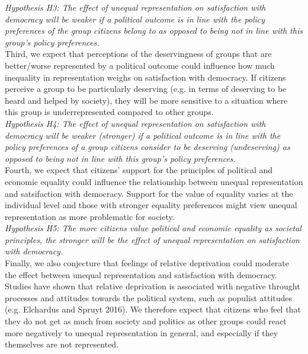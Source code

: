 \documentclass[12pt, letterpaper]{article}
\begin{document}
\begin{spacing}{1.5}
\smallskip  \textit{Hypothesis H3: The effect of unequal representation on satisfaction with democracy will be weaker if a political outcome is in line with the policy preferences of the group citizens belong to as opposed to being not in line with this group's policy preferences.}\\

Third, we expect that perceptions of the deservingness of groups that are better/worse represented by a political outcome could influence how much inequality in representation weighs on satisfaction with democracy. If citizens perceive a group to be particularly deserving (e.g. in terms of deserving to be heard and helped by society), they will be more sensitive to a situation where this group is underrepresented compared to other groups.\\

\smallskip  \textit{Hypothesis H4: The effect of unequal representation on satisfaction with democracy will be weaker (stronger) if a political outcome is in line with the policy preferences of a group citizens consider to be deserving (undeserving) as opposed to being not in line with this group's policy preferences.}\\

Fourth, we expect that citizens' support for the principles of political and economic equality could influence the relationship between unequal representation and satsifaction with democracy. Support for the value of equality varies at the individual level and those with stronger equality preferences might view unequal representation as more problematic for society.\\

\smallskip  \textit{Hypothesis H5: The more citizens value political and economic equality as societal principles, the stronger will be the effect of unequal representation on satisfaction with democracy.}\\

Finally, we also conjecture that feelings of relative deprivation could moderate the effect between unequal representation and satisfaction with democracy. Studies have shown that relative deprivation is associated with negative throught processes and attitudes towards the political system, such as populist attitudes (e.g. Elchardus and Spruyt 2016). We therefore expect that citizens who feel that they do not get as much from society and politics as other groups could react more negatively to unequal representation in general, and especially if they themselves are not represented.\\


\end{spacing}
\end{document}
